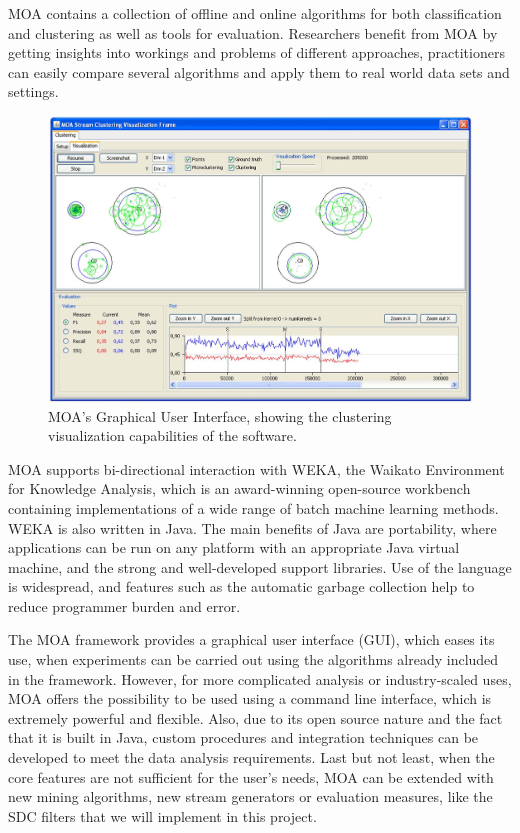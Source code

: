 MOA contains a collection of offline and online algorithms for both classification and clustering as well as tools for evaluation. Researchers benefit from MOA by getting insights into workings and problems of different approaches, practitioners can easily compare several algorithms and apply them to real world data sets and settings.

\begin{figure}
\centering
\includegraphics[width=0.7\linewidth]{figures/moa-gui-2.png}
\caption[MOA's Graphical User Interface]{MOA's Graphical User Interface, showing the clustering visualization capabilities of the software.}
\end{figure}

MOA supports bi-directional interaction with WEKA, the Waikato Environment for Knowledge Analysis, which is an award-winning open-source workbench containing implementations of a wide range of batch machine learning methods. WEKA is also written in Java. The main benefits of Java are portability, where applications can be run on any platform with an appropriate Java virtual machine, and the strong and well-developed support libraries. Use of the language is widespread, and features such as the automatic garbage collection help to reduce programmer burden and error.

The MOA framework provides a graphical user interface (GUI), which eases its use, when experiments can be carried out using the algorithms already included in the framework. However, for more complicated analysis or industry-scaled uses, MOA offers the possibility to be used using a command line interface, which is extremely powerful and flexible. Also, due to its open source nature and the fact that it is built in Java, custom procedures and integration techniques can be developed to meet the data analysis requirements. Last but not least, when the core features are not sufficient for the user's needs, MOA can be extended with new mining algorithms, new stream generators or evaluation measures, like the SDC filters that we will implement in this project.